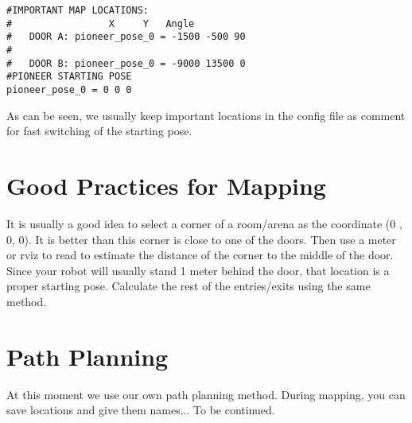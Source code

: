 \documentclass[a4paper, 12pt, oneside]{report}
\begin{document}
\begin{verbatim}
#IMPORTANT MAP LOCATIONS:
#				  X     Y   Angle
#	DOOR A: pioneer_pose_0 = -1500 -500 90
#
#	DOOR B: pioneer_pose_0 = -9000 13500 0
#PIONEER STARTING POSE
pioneer_pose_0 = 0 0 0

\end{verbatim}

As can be seen, we usually keep important locations in the config file as comment for fast switching of the starting pose.


\section{Good Practices for Mapping}
It is usually a good idea to select a corner of a room/arena as the coordinate (0 , 0, 0). It is better than this corner is close to one of the
doors. Then use a meter or rviz to read to estimate the distance of the corner to the middle of the door. Since your robot will usually stand 1 meter behind the door, 
that location is a proper starting pose. Calculate the rest of the entries/exits using the same method.

\section{Path Planning}
At this moment we use our own path planning method. During mapping, you can save locations and give them names... To be continued.
\end{document}
